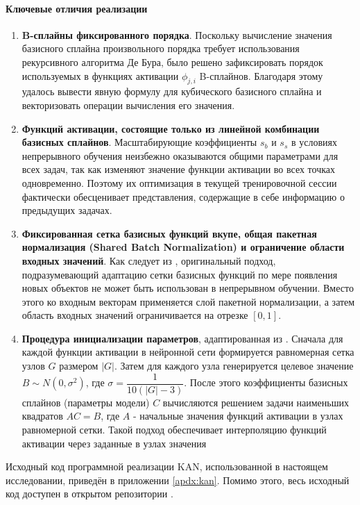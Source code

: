 \documentclass[a4paper,14pt]{extarticle}
\begin{document}
\paragraph{Ключевые отличия реализации}
\begin{enumerate}
    \item \textbf{B-сплайны фиксированного порядка}. Поскольку
        вычисление значения базисного сплайна произвольного порядка требует
        использования рекурсивного алгоритма Де Бура, было решено зафиксировать порядок
        используемых в функциях активации \(\phi_{j,i}\) B-сплайнов. Благодаря этому
        удалось вывести явную формулу для кубического базисного сплайна и векторизовать
        операции вычисления его значения.
    \item \textbf{Функций активации, состоящие только из линейной комбинации
        базисных сплайнов}. Масштабирующие коэффициенты \(s_b\) и \(s_s\) в 
        условиях непрерывного обучения неизбежно оказываются общими параметрами для всех
        задач, так как изменяют значение функции активации во всех точках одновременно. 
        Поэтому их оптимизация в текущей тренировочной сессии фактически обесценивает
        представления, содержащие в себе информацию о предыдущих задачах.
    \item \textbf{Фиксированная сетка базисных функций вкупе, общая
        пакетная нормализация (Shared Batch Normalization) и ограничение области входных
        значений}. Как следует из \cite{lee2025kolmogorov}, оригинальный подход, 
        подразумевающий адаптацию сетки базисных функций по мере появления новых
        объектов не может быть использован в непрерывном обучении. Вместо этого ко
        входным векторам применяется слой пакетной нормализации, а затем
        область входных значений ограничивается на отрезке \([0,1]\).
    \item \textbf{Процедура инициализации параметров}, адаптированная из
        \cite{efficientkan}. Сначала для каждой функции
        активации в нейронной сети формируется равномерная сетка узлов \(G\)
        размером \(|G|\). Затем для каждого узла генерируется целевое значение
        \(B\sim N\!\left(0,\sigma^{2}\right)\), где
        \(\sigma=\dfrac{1}{10(|G|-3)}\). После этого коэффициенты базисных
        сплайнов (параметры модели) \(C\) вычисляются решением задачи наименьших
        квадратов \(AC=B\), где \(A\) - начальные значения функций активации в
        узлах равномерной сетки. Такой подход обеспечивает интерполяцию функций
        активации через заданные в узлах значения
\end{enumerate}
Исходный код программной реализации KAN, использованной в настоящем исследовании,
приведён в приложении \ref{apdx:kan}. Помимо этого, весь исходный код доступен
в открытом репозитории \cite{spbubachelorthesis}.
\end{document}
